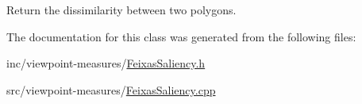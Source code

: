 Return the dissimilarity between two polygons. 



The documentation for this class was generated from the following files\+:\begin{DoxyCompactItemize}
\item 
inc/viewpoint-\/measures/\hyperlink{_feixas_saliency_8h}{Feixas\+Saliency.\+h}\item 
src/viewpoint-\/measures/\hyperlink{_feixas_saliency_8cpp}{Feixas\+Saliency.\+cpp}\end{DoxyCompactItemize}
